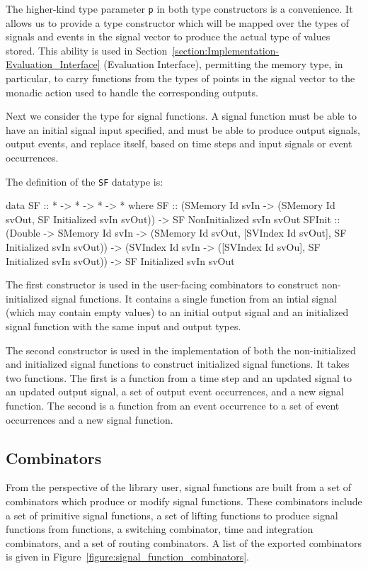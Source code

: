 The higher-kind type parameter {\tt p} in both type constructors is a
convenience. It allows us to provide a type constructor which will be mapped
over the types of signals and events in the signal vector to produce the actual
type of values stored. This ability is used in
Section~\ref{section:Implementation-Evaluation_Interface} (Evaluation Interface),
permitting the memory type, in particular, to carry functions from the types of
points in the signal vector to the monadic action used to handle the
corresponding outputs.

Next we consider the type for signal functions. A signal function must be able
to have an initial signal input specified, and must be able to produce output
signals, output events, and replace itself, based on time steps and input
signals or event occurrences.

The definition of the {\tt SF} datatype is:

\begin{code}
data SF :: * -> * -> * -> * where
  SF     :: (SMemory Id svIn -> (SMemory Id svOut, SF Initialized svIn svOut))
         -> SF NonInitialized svIn svOut
  SFInit :: (Double -> SMemory Id svIn 
             -> (SMemory Id svOut, 
                 [SVIndex Id svOut],
                 SF Initialized svIn svOut))
         -> (SVIndex Id svIn 
             -> ([SVIndex Id svOu], SF Initialized svIn svOut))
         -> SF Initialized svIn svOut
\end{code}

The first constructor is used in the user-facing combinators to construct
non-initialized signal functions. It contains a single function from an intial
signal (which may contain empty values) to an initial output signal and
an initialized signal function with the same input and output types.

The second constructor is used in the implementation of both the non-initialized
and initialized signal functions to construct initialized signal functions. It
takes two functions. The first is a function from a time step and an updated
signal to an updated output signal, a set of output event occurrences, and a new
signal function. The second is a function from an event occurrence to a set
of event occurrences and a new signal function. 

\subsection{Combinators}
\label{subsection:Implementation-Signal_Functions-Combinators}
From the perspective of the library user, signal functions are built from a set
of combinators which produce or modify signal functions. These combinators
include a set of primitive signal functions, a set of lifting functions to
produce signal functions from functions, a switching combinator,
time and integration combinators, and a set of routing combinators. A list
of the exported combinators is given in
Figure~\ref{figure:signal_function_combinators}.

